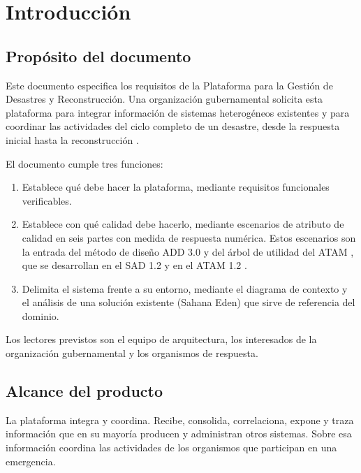 \documentclass[11pt,letterpaper]{article}
\begin{document}
\tableofcontents
\newpage

\section{Introducción}
\label{sec:introduccion}

\subsection{Propósito del documento}

Este documento especifica los requisitos de la Plataforma para la Gestión de Desastres y
Reconstrucción. Una organización gubernamental solicita esta plataforma para integrar información
de sistemas heterogéneos existentes y para coordinar las actividades del ciclo completo de un
desastre, desde la respuesta inicial hasta la reconstrucción \cite{enunciado}.

El documento cumple tres funciones:

\begin{enumerate}
  \item Establece qué debe hacer la plataforma, mediante requisitos funcionales verificables.
  \item Establece con qué calidad debe hacerlo, mediante escenarios de atributo de calidad en seis
        partes con medida de respuesta numérica. Estos escenarios son la entrada del método de
        diseño ADD 3.0 \cite{cervantes} y del árbol de utilidad del ATAM \cite{bass}, que se
        desarrollan en el SAD 1.2 \cite{sad} y en el ATAM 1.2 \cite{atam}.
  \item Delimita el sistema frente a su entorno, mediante el diagrama de contexto y el análisis de
        una solución existente (Sahana Eden) que sirve de referencia del dominio.
\end{enumerate}

Los lectores previstos son el equipo de arquitectura, los interesados de la organización
gubernamental y los organismos de respuesta.

\subsection{Alcance del producto}

La plataforma integra y coordina. Recibe, consolida, correlaciona, expone y traza información que
en su mayoría producen y administran otros sistemas. Sobre esa información coordina las actividades
de los organismos que participan en una emergencia.
\end{document}
